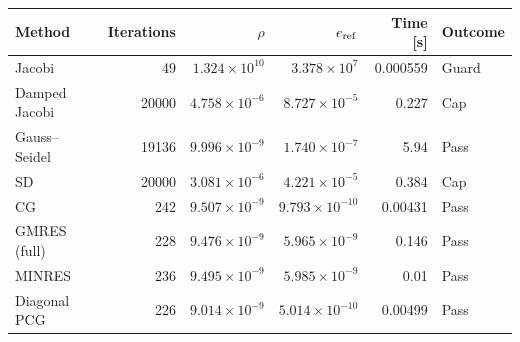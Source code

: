 \begin{tabular}{lrrrrl}
\toprule
Method & Iterations & $\rho$ & $e_{\rm ref}$ & Time [s] & Outcome\\
\midrule
Jacobi & 49 & $1.324\times10^{10}$ & $3.378\times10^{7}$ & 0.000559 & Guard \\
Damped Jacobi & 20000 & $4.758\times10^{-6}$ & $8.727\times10^{-5}$ & 0.227 & Cap \\
Gauss--Seidel & 19136 & $9.996\times10^{-9}$ & $1.740\times10^{-7}$ & 5.94 & Pass \\
SD & 20000 & $3.081\times10^{-6}$ & $4.221\times10^{-5}$ & 0.384 & Cap \\
CG & 242 & $9.507\times10^{-9}$ & $9.793\times10^{-10}$ & 0.00431 & Pass \\
GMRES (full) & 228 & $9.476\times10^{-9}$ & $5.965\times10^{-9}$ & 0.146 & Pass \\
MINRES & 236 & $9.495\times10^{-9}$ & $5.985\times10^{-9}$ & 0.01 & Pass \\
Diagonal PCG & 226 & $9.014\times10^{-9}$ & $5.014\times10^{-10}$ & 0.00499 & Pass \\
\bottomrule
\end{tabular}
